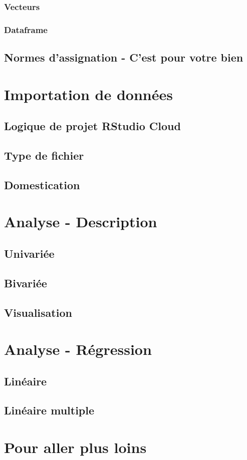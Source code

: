 \documentclass[10.5pt,a4paper]{article}
\begin{document}
    \subsubsection{Vecteurs}
    \subsubsection{Dataframe}
  \subsection{Normes d'assignation - C'est pour votre bien}

  
\section{Importation de données}
  \subsection{Logique de projet RStudio Cloud}
  \subsection{Type de fichier}
  \subsection{Domestication}

  
\section{Analyse - Description}
  \subsection{Univariée}
  \subsection{Bivariée}
  \subsection{Visualisation}


\section{Analyse - Régression}
  \subsection{Linéaire}
  \subsection{Linéaire multiple}

  
\section{Pour aller plus loins}
 
%
%
\end{document}
